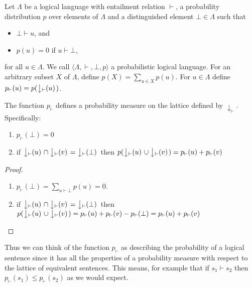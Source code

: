 \begin{defn}
Let $\Lambda$ be a logical language with entailment relation $\vdash$, a probability distribution $p$ over elements of $\Lambda$ and a distinguished element $\bot \in \Lambda$ such that
\begin{itemize}
\item $\bot \vdash u$, and
\item $p(u) = 0$ if $u \vdash \bot$,
\end{itemize}
for all $u \in \Lambda$. We call $\langle \Lambda, \vdash, \bot, p\rangle$ a probabilistic logical language. For an arbitrary subset $X$ of $\Lambda$, define $p(X) = \sum_{u\in X}p(u)$. For $u \in \Lambda$ define $p_\vdash(u) = p(\left\downarrow_\vdash(u)\right.)$.
\end{defn}
\begin{prop}
The function $p_\vdash$ defines a probability measure on the lattice defined by $\downarrow_\vdash$. Specifically:
\begin{enumerate}
\item $p_\vdash(\bot) = 0$
\item if $\left\downarrow_\vdash(u)\right. \cap \left\downarrow_\vdash(v)\right. = \left\downarrow_\vdash(\bot)\right.$ then $p(\left\downarrow_\vdash(u)\right. \cup \left\downarrow_\vdash(v)\right.) = p_\vdash(u) + p_\vdash(v)$
\end{enumerate}
\end{prop}
\begin{proof}
\mbox{}
\begin{enumerate}
\item $p_\vdash(\bot) = \sum_{u\vdash\bot}p(u) = 0$.
\item if $\left\downarrow_\vdash(u)\right. \cap \left\downarrow_\vdash(v)\right. = \left\downarrow_\vdash(\bot)\right.$ then $p(\left\downarrow_\vdash(u)\right. \cup \left\downarrow_\vdash(v)\right.) = p_\vdash(u) + p_\vdash(v) - p_\vdash(\bot) =  p_\vdash(u) + p_\vdash(v)$
\end{enumerate}
\end{proof}\noindent
Thus we can think of the function $p_\vdash$ as describing the probability of a logical sentence since it has all the properties of a probability measure with respect to the lattice of equivalent sentences. This means, for example that if $s_1 \vdash s_2$ then $p_\vdash(s_1) \le p_\vdash(s_2)$ as we would expect.

